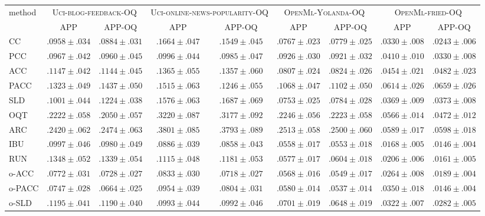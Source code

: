\begin{tabular}{lcccccccc}
  \toprule
  \multirow{2}{*}{method} & \multicolumn{2}{c}{\textsc{Uci-blog-feedback-OQ}} & \multicolumn{2}{c}{\textsc{Uci-online-news-popularity-OQ}} & \multicolumn{2}{c}{\textsc{OpenMl-Yolanda-OQ}} & \multicolumn{2}{c}{\textsc{OpenMl-fried-OQ}} \\
  & APP & APP-OQ & APP & APP-OQ & APP & APP-OQ & APP & APP-OQ \\
  \midrule
  CC & ${.0958 \pm .034}$ & ${.0884 \pm .031}$ & ${.1664 \pm .047}$ & ${.1549 \pm .045}$ & ${.0767 \pm .023}$ & ${.0779 \pm .025}$ & ${.0330 \pm .008}$ & ${.0243 \pm .006}$ \\
  PCC & ${.0967 \pm .042}$ & ${.0960 \pm .045}$ & ${.0996 \pm .044}$ & ${.0985 \pm .047}$ & ${.0926 \pm .030}$ & ${.0921 \pm .032}$ & ${.0410 \pm .010}$ & ${.0330 \pm .008}$ \\
  ACC & ${.1147 \pm .042}$ & ${.1144 \pm .045}$ & ${.1365 \pm .055}$ & ${.1357 \pm .060}$ & ${.0807 \pm .024}$ & ${.0824 \pm .026}$ & ${.0454 \pm .021}$ & ${.0482 \pm .023}$ \\
  PACC & ${.1323 \pm .049}$ & ${.1437 \pm .050}$ & ${.1515 \pm .063}$ & ${.1246 \pm .055}$ & ${.1068 \pm .047}$ & ${.1102 \pm .050}$ & ${.0614 \pm .026}$ & ${.0659 \pm .026}$ \\
  SLD & ${.1001 \pm .044}$ & ${.1224 \pm .038}$ & ${.1576 \pm .063}$ & ${.1687 \pm .069}$ & ${.0753 \pm .025}$ & ${.0784 \pm .028}$ & ${.0369 \pm .009}$ & ${.0373 \pm .008}$ \\[.5em]
  OQT & ${.2222 \pm .058}$ & ${.2050 \pm .057}$ & ${.3220 \pm .087}$ & ${.3177 \pm .092}$ & ${.2246 \pm .056}$ & ${.2223 \pm .058}$ & ${.0566 \pm .014}$ & ${.0472 \pm .012}$ \\
  ARC & ${.2420 \pm .062}$ & ${.2474 \pm .063}$ & ${.3801 \pm .085}$ & ${.3793 \pm .089}$ & ${.2513 \pm .058}$ & ${.2500 \pm .060}$ & ${.0589 \pm .017}$ & ${.0598 \pm .018}$ \\
  IBU & ${.0997 \pm .046}$ & ${.0980 \pm .049}$ & ${.0886 \pm .039}$ & ${.0858 \pm .043}$ & $\mathbf{.0558 \pm .017}$ & ${.0553 \pm .018}$ & $\mathbf{.0168 \pm .005}$ & $\mathbf{.0146 \pm .004}$ \\
  RUN & ${.1348 \pm .052}$ & ${.1339 \pm .054}$ & ${.1115 \pm .048}$ & ${.1181 \pm .053}$ & ${.0577 \pm .017}$ & ${.0604 \pm .018}$ & ${.0206 \pm .006}$ & ${.0161 \pm .005}$ \\[.5em]
  o-ACC & ${.0772 \pm .031}$ & ${.0728 \pm .027}$ & $\mathbf{.0833 \pm .030}$ & $\mathbf{.0718 \pm .027}$ & ${.0568 \pm .016}$ & ${.0549 \pm .017}$ & ${.0264 \pm .008}$ & ${.0189 \pm .004}$ \\
  o-PACC & $\mathbf{.0747 \pm .028}$ & $\mathbf{.0664 \pm .025}$ & ${.0954 \pm .039}$ & ${.0804 \pm .031}$ & ${.0580 \pm .014}$ & $\mathbf{.0537 \pm .014}$ & ${.0350 \pm .018}$ & $\mathbf{.0146 \pm .004}$ \\
  o-SLD & ${.1195 \pm .041}$ & ${.1190 \pm .040}$ & ${.0993 \pm .044}$ & ${.0992 \pm .046}$ & ${.0701 \pm .019}$ & ${.0648 \pm .019}$ & ${.0322 \pm .007}$ & ${.0282 \pm .005}$ \\
  \bottomrule
\end{tabular}
